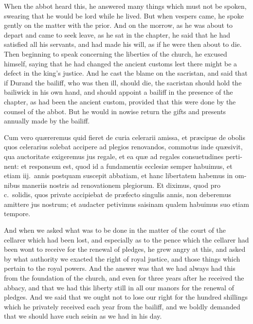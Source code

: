 \documentclass[10pt]{book}
\begin{document}
\begin{paracol}{2}
\switchcolumn

When the abbot heard this, he answered many things which must not be spoken, swearing that he would be lord while he lived. But when vespers came, he spoke gently on the matter with the prior. And on the morrow, as he was about to depart and came to seek leave, as he sat in the chapter, he said that he had satisfied all his servants, and had made his will, as if he were then about to die. Then beginning to speak concerning the liberties of the church, he excused himself, saying that he had changed the ancient customs lest there might be a defect in the king's justice. And he cast the blame on the sacristan, and said that if Durand the bailiff, who was then ill, should die, the sacristan should hold the bailiwick in his own hand, and should appoint a bailiff in the presence of the chapter, as had been the ancient custom, provided that this were done by the counsel of the abbot. But he would in nowise return the gifts and presents annually made by the bailiff.

\switchcolumn*

\begin{otherlanguage}{latin}
Cum vero qu\ae{}reremus quid fieret de curia celerarii amissa, et pr\ae{}cipue de obolis quos celerarius solebat accipere ad plegios renovandos, commotus inde qu\ae{}sivit, qua auctoritate exigeremus jus regale, et ea qu\ae{} ad regales consuetudines pertinent: et responsum est, quod id a fundamentis ecclesi\ae{} semper habuimus, et etiam iij.\ annis postquam suscepit abbatiam, et hanc libertatem habemus in omnibus maneriis nostris ad renovationem plegiorum. Et diximus, quod pro c.\ solidis, quos private accipiebat de pr\ae{}fecto singulis annis, non deberemus amittere jus nostrum; et audacter petivimus saisinam qualem habuimus suo etiam tempore.
\end{otherlanguage}

\switchcolumn

And when we asked what was to be done in the matter of the court of the cellarer which had been lost, and especially as to the pence which the cellarer had been wont to receive for the renewal of pledges, he grew angry at this, and asked by what authority we exacted the right of royal justice, and those things which pertain to the royal powers. And the answer was that we had always had this from the foundation of the church, and even for three years after he received the abbacy, and that we had this liberty still in all our manors for the renewal of pledges. And we said that we ought not to lose our right for the hundred shillings which he privately received each year from the bailiff, and we boldly demanded that we should have such seisin as we had in his day.


\end{paracol}
\end{document}
